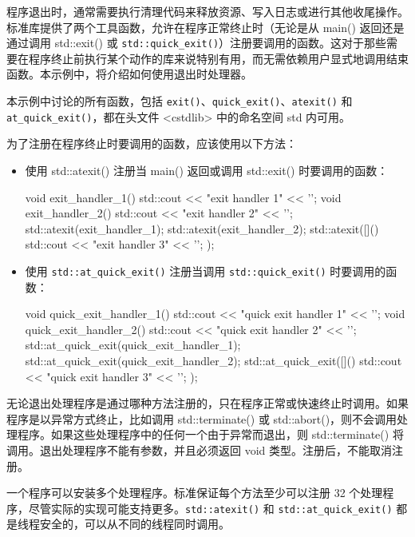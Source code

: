 程序退出时，通常需要执行清理代码来释放资源、写入日志或进行其他收尾操作。标准库提供了两个工具函数，允许在程序正常终止时（无论是从 main() 返回还是通过调用 std::exit() 或 \verb|std::quick_exit()|）注册要调用的函数。这对于那些需要在程序终止前执行某个动作的库来说特别有用，而无需依赖用户显式地调用结束函数。本示例中，将介绍如何使用退出时处理器。


本示例中讨论的所有函数，包括 \verb|exit()|、\verb|quick_exit()|、\verb|atexit()| 和 \verb|at_quick_exit()|，都在头文件 <cstdlib> 中的命名空间 std 内可用。


为了注册在程序终止时要调用的函数，应该使用以下方法：

\begin{itemize}
\item
使用 std::atexit() 注册当 main() 返回或调用 std::exit() 时要调用的函数：

\begin{cpp}
void exit_handler_1()
{
    std::cout << "exit handler 1" << '\n';
}
void exit_handler_2()
{
    std::cout << "exit handler 2" << '\n';
}
std::atexit(exit_handler_1);
std::atexit(exit_handler_2);
std::atexit([]() {std::cout << "exit handler 3" << '\n'; });
\end{cpp}

\item
使用 \verb|std::at_quick_exit()| 注册当调用 \verb|std::quick_exit()| 时要调用的函数：

\begin{cpp}
void quick_exit_handler_1()
{
    std::cout << "quick exit handler 1" << '\n';
}
void quick_exit_handler_2()
{
    std::cout << "quick exit handler 2" << '\n';
}
std::at_quick_exit(quick_exit_handler_1);
std::at_quick_exit(quick_exit_handler_2);
std::at_quick_exit([]() {
    std::cout << "quick exit handler 3" << '\n'; });
\end{cpp}
\end{itemize}


无论退出处理程序是通过哪种方法注册的，只在程序正常或快速终止时调用。如果程序是以异常方式终止，比如调用 std::terminate() 或 std::abort()，则不会调用处理程序。如果这些处理程序中的任何一个由于异常而退出，则 std::terminate() 将调用。退出处理程序不能有参数，并且必须返回 void 类型。注册后，不能取消注册。

一个程序可以安装多个处理程序。标准保证每个方法至少可以注册 32 个处理程序，尽管实际的实现可能支持更多。\verb|std::atexit()| 和 \verb|std::at_quick_exit()| 都是线程安全的，可以从不同的线程同时调用。

